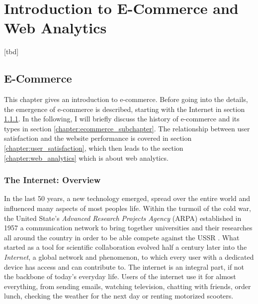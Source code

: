 
\chapter{Introduction to E-Commerce and Web Analytics}

[tbd]






\section{E-Commerce} %
\label{chapter:e-commerce}

This chapter gives an introduction to e-commerce.
Before going into the details, the emergence of e-commerce is described, starting with the Internet in section \ref{chapter:internet}.
In the following, I will briefly discuss the history of e-commerce and its types in section \ref{chapter:ecommerce_subchapter}.
The relationship between user satisfaction and the website performance is covered in section \ref{chapter:user_satisfaction}, which then leads to the section \ref{chapter:web_analytics} which is about web analytics.



\subsection{The Internet: Overview} %
\label{chapter:internet}

In the last 50 years, a new technology emerged, spread over the entire world and influenced many aspects of most peoples life.
Within the turmoil of the cold war, the United State's \textit{Advanced Research Projects Agency} (ARPA) established in 1957 a communication network to bring together universities and their researches all around the country in order to be able compete against the USSR \cite{2011Cohen}.
What started as a tool for scientific collaboration evolved half a century later into the \textit{Internet}, a global network and phenomenon, to which every user with a dedicated device has access and can contribute to.
The internet is an integral part, if not the backbone of today's everyday life.
Users of the internet use it for almost everything, from sending emails, watching television, chatting with friends, order lunch, checking the weather for the next day or renting motorized scooters.

